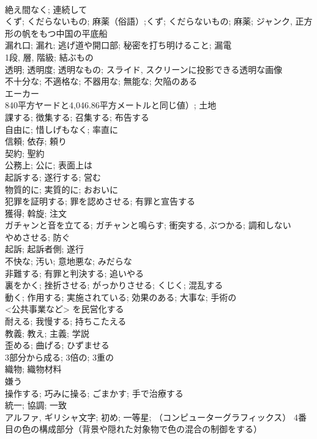 \documentclass[8pt]{extreport}
\begin{document}
\begin{CJK}{UTF8}{min}
\\	絶え間なく; 連続して	
\\	くず; くだらないもの; 麻薬（俗語）;くず; くだらないもの; 麻薬; ジャンク, 正方形の帆をもつ中国の平底船	
\\	漏れ口; 漏れ; 逃げ道や開口部; 秘密を打ち明けること; 漏電	
\\	1段, 層, 階級; 結ぶもの	
\\	透明; 透明度; 透明なもの; スライド, スクリーンに投影できる透明な画像	
\\	不十分な; 不適格な; 不器用な; 無能な; 欠陥のある	
\\	エーカー
\\	840平方ヤードと4,046.86平方メートルと同じ値）; 土地	
\\	課する; 徴集する; 召集する; 布告する	
\\	自由に; 惜しげもなく; 率直に	
\\	信頼; 依存; 頼り	
\\	契約; 聖約	
\\	公務上; 公に; 表面上は	
\\	起訴する; 遂行する; 営む	
\\	物質的に; 実質的に; おおいに	
\\	犯罪を証明する; 罪を認めさせる; 有罪と宣告する	
\\	獲得; 斡旋; 注文	
\\	ガチャンと音を立てる; ガチャンと鳴らす; 衝突する, ぶつかる; 調和しない	
\\	やめさせる; 防ぐ	
\\	起訴; 起訴者側; 遂行	
\\	不快な; 汚い; 意地悪な; みだらな	
\\	非難する; 有罪と判決する; 追いやる	
\\	裏をかく; 挫折させる; がっかりさせる; くじく; 混乱する	
\\	動く; 作用する; 実施されている; 効果のある; 大事な; 手術の	
\\	<公共事業など> を民営化する	
\\	耐える; 我慢する; 持ちこたえる	
\\	教義; 教え; 主義; 学説	
\\	歪める; 曲げる; ひずませる	
\\	3部分から成る; 3倍の; 3重の	
\\	織物; 織物材料	
\\	嫌う	
\\	操作する; 巧みに操る; ごまかす; 手で治療する	
\\	統一; 協調; 一致	
\\	アルファ, ギリシャ文字; 初め; 一等星; （コンピューターグラフィックス） 4番目の色の構成部分（背景や隠れた対象物で色の混合の制御をする）	

\end{CJK}
\end{document}
